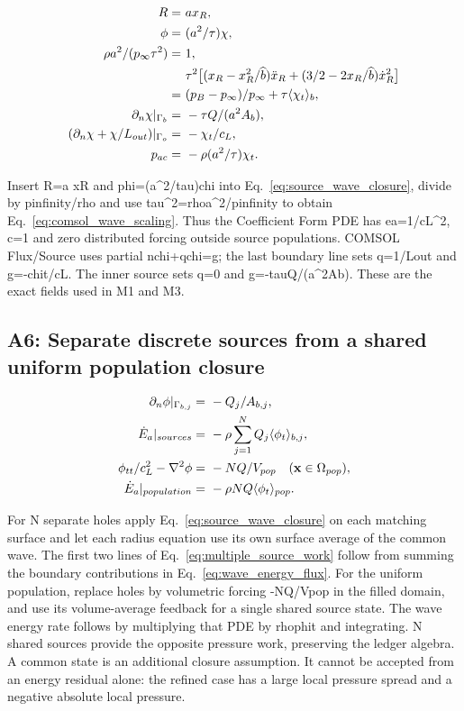 \documentclass[11pt]{article}
\begin{document}
\begin{align}
R= & ~a x_R, \notag \\
\phi= & ~(a^2/\tau)\chi, \notag \\
\rho a^2/(p_\infty\tau^2)= & ~1, \notag \\
& ~\tau^2\big[(x_R-x_R^2/\widehat b)\ddot x_R+(3/2-2x_R/\widehat b)\dot x_R^2\big] \notag \\
= & ~(p_B-p_\infty)/p_\infty+\tau\langle\chi_t\rangle_b, \notag \\
\partial_n\chi|_{\Gamma_b}= & ~-\tau Q/(a^2A_b), \notag \\
(\partial_n\chi+\chi/L_{out})|_{\Gamma_o}= & ~-\chi_t/c_L, \notag \\
p_{ac}= & ~-\rho(a^2/\tau)\chi_t. \label{eq:comsol_wave_scaling}
\end{align}

Insert R=a xR and phi=(a\textasciicircum{}2/tau)chi into Eq.~\eqref{eq:source_wave_closure}, divide by pinfinity/rho and use tau\textasciicircum{}2=rhoa\textasciicircum{}2/pinfinity to obtain Eq.~\eqref{eq:comsol_wave_scaling}. Thus the Coefficient Form PDE has ea=1/cL\textasciicircum{}2, c=1 and zero distributed forcing outside source populations. COMSOL Flux/Source uses partial nchi+qchi=g; the last boundary line sets q=1/Lout and g=-chit/cL. The inner source sets q=0 and g=-tauQ/(a\textasciicircum{}2Ab). These are the exact fields used in M1 and M3.

\subsection{A6: Separate discrete sources from a shared uniform population closure}

\begin{align}
\partial_n\phi|_{\Gamma_{b,j}}= & ~-Q_j/A_{b,j}, \notag \\
\dot E_a|_{sources}= & ~-\rho\sum_{j=1}^{N}Q_j\langle\phi_t\rangle_{b,j}, \notag \\
\phi_{tt}/c_L^2-\nabla^2\phi= & ~-NQ/V_{pop}\quad(\mathbf x\in\Omega_{pop}), \notag \\
\dot E_a|_{population}= & ~-\rho NQ\langle\phi_t\rangle_{pop}. \label{eq:multiple_source_work}
\end{align}

For N separate holes apply Eq.~\eqref{eq:source_wave_closure} on each matching surface and let each radius equation use its own surface average of the common wave. The first two lines of Eq.~\eqref{eq:multiple_source_work} follow from summing the boundary contributions in Eq.~\eqref{eq:wave_energy_flux}. For the uniform population, replace holes by volumetric forcing -NQ/Vpop in the filled domain, and use its volume-average feedback for a single shared source state. The wave energy rate follows by multiplying that PDE by rhophit and integrating. N shared sources provide the opposite pressure work, preserving the ledger algebra. A common state is an additional closure assumption. It cannot be accepted from an energy residual alone: the refined case has a large local pressure spread and a negative absolute local pressure.
\end{document}
